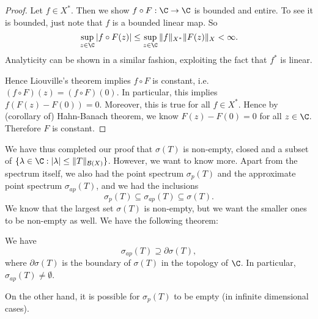 \documentclass[a4paper]{article}
\begin{document}
\begin{proof}
  Let $f \in X^*$. Then we show $f \circ F: \C \to \C$ is bounded and entire. To see it is bounded, just note that $f$ is a bounded linear map. So
  \[
    \sup_{z \in \C} |f\circ F(z)| \leq \sup_{ z \in \C} \|f\|_{X^*} \|F(z)\|_X < \infty.
  \]
  Analyticity can be shown in a similar fashion, exploiting the fact that $f^*$ is linear.

  Hence Liouville's theorem implies $f \circ F$ is constant, i.e.\ $(f \circ F)(z) = (f\circ F)(0)$. In particular, this implies $f(F(z) - F(0)) = 0$. Moreover, this is true for all $f \in X^*$. Hence by (corollary of) Hahn-Banach theorem, we know $F(z) - F(0) = 0$ for all $z \in \C$. Therefore $F$ is constant.
\end{proof}
We have thus completed our proof that $\sigma(T)$ is non-empty, closed and a subset of $\{\lambda \in \C: |\lambda| \leq \|T\|_{\mathcal{B}(X)}\}$. However, we want to know more. Apart from the spectrum itself, we also had the point spectrum $\sigma_p(T)$ and the approximate point spectrum $\sigma_{ap}(T)$, and we had the inclusions
\[
  \sigma_p(T) \subseteq \sigma_{ap}(T) \subseteq \sigma(T).
\]
We know that the largest set $\sigma(T)$ is non-empty, but we want the smaller ones to be non-empty as well. We have the following theorem:
\begin{thm}
  We have
  \[
    \sigma_{ap}(T) \supseteq \partial \sigma(T),
  \]
  where $\partial \sigma(T)$ is the boundary of $\sigma(T)$ in the topology of $\C$. In particular, $\sigma_{ap}(T) \not= \emptyset$.
\end{thm}
On the other hand, it is possible for $\sigma_p(T)$ to be empty (in infinite dimensional cases).
\end{document}
